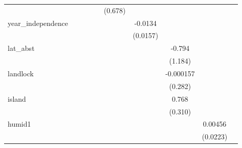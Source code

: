 {\begin{tabular}{l*{9}{c}}
            &                     &                     &                     &                     &     (0.678)         &                     &                     &                     &                     \\
[1em]
year\_independence&                     &                     &                     &                     &                     &     -0.0134         &                     &                     &                     \\
            &                     &                     &                     &                     &                     &    (0.0157)         &                     &                     &                     \\
[1em]
lat\_abst    &                     &                     &                     &                     &                     &                     &      -0.794         &                     &                     \\
            &                     &                     &                     &                     &                     &                     &     (1.184)         &                     &                     \\
[1em]
landlock    &                     &                     &                     &                     &                     &                     &   -0.000157         &                     &                     \\
            &                     &                     &                     &                     &                     &                     &     (0.282)         &                     &                     \\
[1em]
island      &                     &                     &                     &                     &                     &                     &       0.768\sym{**} &                     &                     \\
            &                     &                     &                     &                     &                     &                     &     (0.310)         &                     &                     \\
[1em]
humid1      &                     &                     &                     &                     &                     &                     &                     &     0.00456         &                     \\
            &                     &                     &                     &                     &                     &                     &                     &    (0.0223)         &                     \\

\end{tabular}}
